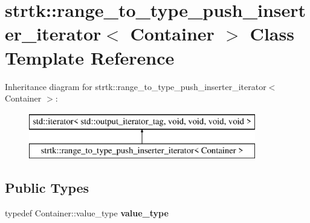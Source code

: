 \hypertarget{classstrtk_1_1range__to__type__push__inserter__iterator}{\section{strtk\-:\-:range\-\_\-to\-\_\-type\-\_\-push\-\_\-inserter\-\_\-iterator$<$ Container $>$ Class Template Reference}
\label{classstrtk_1_1range__to__type__push__inserter__iterator}
}
Inheritance diagram for strtk\-:\-:range\-\_\-to\-\_\-type\-\_\-push\-\_\-inserter\-\_\-iterator$<$ Container $>$\-:\begin{figure}[H]
\begin{center}
\leavevmode
\includegraphics[height=2.000000cm]{classstrtk_1_1range__to__type__push__inserter__iterator}
\end{center}
\end{figure}
\subsection*{Public Types}
\begin{DoxyCompactItemize}
\item 
\hypertarget{classstrtk_1_1range__to__type__push__inserter__iterator_afae54a97ca5d5fb4c6fcb437eb1286f9}{typedef Container\-::value\-\_\-type {\bfseries value\-\_\-type}}\label{classstrtk_1_1range__to__type__push__inserter__iterator_afae54a97ca5d5fb4c6fcb437eb1286f9}

\end{DoxyCompactItemize}
